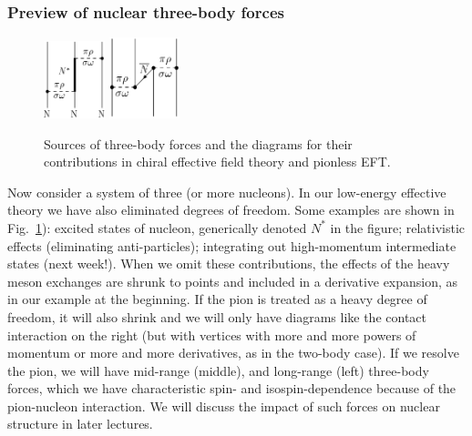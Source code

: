 \subsubsection{Preview of nuclear three-body forces}


  \begin{figure}[tbh]
  \begin{center}
    \includegraphics[width=0.7in]{figures/mathiot_3body1}\hspace*{0.4cm}
    \includegraphics[width=0.8in]{figures/mathiot_3body2}
    \quad\raisebox{.4in}{\huge $\Longrightarrow$}\quad
    \quad\raisebox{.4in}{\huge $\Longrightarrow$}\quad
    \caption{Sources of three-body forces and the diagrams for
    their contributions in chiral effective field theory and pionless 
    EFT.}
    \label{fig:mathiot_3body}
  \end{center}
  \end{figure}



Now consider a system of three (or more nucleons).  In our low-energy effective
theory we have also eliminated degrees of freedom.
Some examples are shown in
Fig.~\ref{fig:mathiot_3body}):
       \bi
         \I excited states of nucleon, generically denoted $N^\ast$ in the figure;
         \I relativistic effects (eliminating anti-particles);
         \I integrating out high-momentum intermediate states (next week!).
       \ei
When we omit these contributions, the effects of the heavy meson exchanges are 
shrunk to points and included in a derivative expansion, as in our example
at the beginning.  If the pion is treated as a heavy degree of freedom,
it will also shrink and we will only have diagrams like the contact interaction
on the right (but with vertices with more and more powers of momentum 
or more and more derivatives, as in the two-body case).  If we resolve the
pion, we will have mid-range (middle), and long-range (left) three-body
forces, which we have characteristic spin- and isospin-dependence because
of the pion-nucleon interaction.  We will discuss the impact of such forces
on nuclear structure in later lectures.


